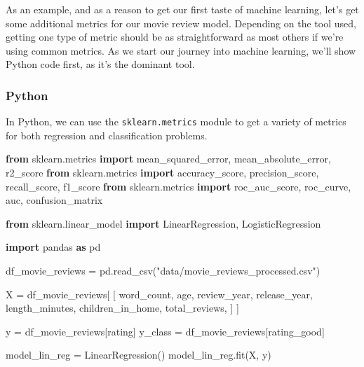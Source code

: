 \documentclass[
  letterpaper,
]{krantz}
\newenvironment{Shaded}{}{}
\newcommand{\ImportTok}[1]{\textcolor[rgb]{0.00,0.50,0.00}{\textbf{#1}}}
\newcommand{\NormalTok}[1]{#1}
\newcommand{\OperatorTok}[1]{\textcolor[rgb]{0.40,0.40,0.40}{#1}}
\newcommand{\StringTok}[1]{\textcolor[rgb]{0.25,0.44,0.63}{#1}}
\begin{document}
As an example, and as a reason to get our first taste of machine
learning, let's get some additional metrics for our movie review model.
Depending on the tool used, getting one type of metric should be as
straightforward as most others if we're using common metrics. As we
start our journey into machine learning, we'll show Python code first,
as it's the dominant tool.

\subsubsection{Python}

In Python, we can use the \texttt{sklearn.metrics} module to get a
variety of metrics for both regression and classification problems.

\begin{Shaded}
\begin{Highlighting}[]
\ImportTok{from}\NormalTok{ sklearn.metrics }\ImportTok{import}\NormalTok{ mean\_squared\_error, mean\_absolute\_error, r2\_score}
\ImportTok{from}\NormalTok{ sklearn.metrics }\ImportTok{import}\NormalTok{ accuracy\_score, precision\_score, recall\_score, f1\_score}
\ImportTok{from}\NormalTok{ sklearn.metrics }\ImportTok{import}\NormalTok{ roc\_auc\_score, roc\_curve, auc, confusion\_matrix}

\ImportTok{from}\NormalTok{ sklearn.linear\_model }\ImportTok{import}\NormalTok{ LinearRegression, LogisticRegression}

\ImportTok{import}\NormalTok{ pandas }\ImportTok{as}\NormalTok{ pd}

\NormalTok{df\_movie\_reviews }\OperatorTok{=}\NormalTok{ pd.read\_csv(}\StringTok{"data/movie\_reviews\_processed.csv"}\NormalTok{)}

\NormalTok{X }\OperatorTok{=}\NormalTok{ df\_movie\_reviews[}
\NormalTok{    [}
        \StringTok{\textquotesingle{}word\_count\textquotesingle{}}\NormalTok{,}
        \StringTok{\textquotesingle{}age\textquotesingle{}}\NormalTok{,}
        \StringTok{\textquotesingle{}review\_year\textquotesingle{}}\NormalTok{,}
        \StringTok{\textquotesingle{}release\_year\textquotesingle{}}\NormalTok{,}
        \StringTok{\textquotesingle{}length\_minutes\textquotesingle{}}\NormalTok{,}
        \StringTok{\textquotesingle{}children\_in\_home\textquotesingle{}}\NormalTok{,}
        \StringTok{\textquotesingle{}total\_reviews\textquotesingle{}}\NormalTok{,}
\NormalTok{    ]}
\NormalTok{]}

\NormalTok{y }\OperatorTok{=}\NormalTok{ df\_movie\_reviews[}\StringTok{\textquotesingle{}rating\textquotesingle{}}\NormalTok{]}
\NormalTok{y\_class }\OperatorTok{=}\NormalTok{ df\_movie\_reviews[}\StringTok{\textquotesingle{}rating\_good\textquotesingle{}}\NormalTok{]}

\NormalTok{model\_lin\_reg }\OperatorTok{=}\NormalTok{ LinearRegression()}
\NormalTok{model\_lin\_reg.fit(X, y)}
\end{Highlighting}
\end{Shaded}
\end{document}
